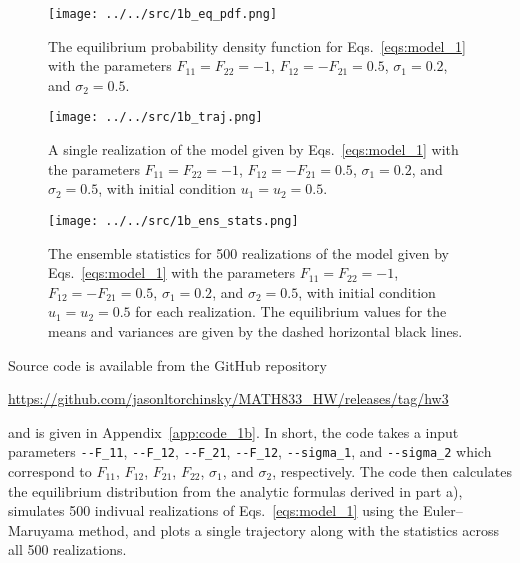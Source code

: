 \begin{enumerate}[a)]
	\begin{figure}[H]
		\centering
		\texttt{[image: ../../src/1b\_eq\_pdf.png]}
		\caption{The equilibrium probability density function for Eqs.~\ref{eqs:model_1} with the parameters $F_{11} = F_{22} = -1$, $F_{12} = -F_{21} = 0.5$, $\sigma_1 = 0.2$, and $\sigma_2 = 0.5$.}
		\label{fig:1b_eq_pdf}
	\end{figure}
	
	\begin{figure}[H]
		\centering
		\texttt{[image: ../../src/1b\_traj.png]}
		\caption{A single realization of the model given by Eqs.~\ref{eqs:model_1} with the parameters $F_{11} = F_{22} = -1$, $F_{12} = -F_{21} = 0.5$, $\sigma_1 = 0.2$, and $\sigma_2 = 0.5$, with initial condition $u_1 = u_2 = 0.5$.}
		\label{fig:1b_traj}
	\end{figure}
	
	\begin{figure}[H]
		\centering
		\texttt{[image: ../../src/1b\_ens\_stats.png]}
		\caption{The ensemble statistics for 500 realizations of the model given by Eqs.~\ref{eqs:model_1} with the parameters $F_{11} = F_{22} = -1$, $F_{12} = -F_{21} = 0.5$, $\sigma_1 = 0.2$, and $\sigma_2 = 0.5$, with initial condition $u_1 = u_2 = 0.5$ for each realization. The equilibrium values for the means and variances are given by the dashed horizontal black lines.}
		\label{fig:1b_ens_stats}
	\end{figure}
	
	Source code is available from the GitHub repository
	
	\begin{center}
		\url{https://github.com/jasonltorchinsky/MATH833_HW/releases/tag/hw3}
	\end{center}

	and is given in Appendix~\ref{app:code_1b}. In short, the code takes a input parameters \texttt{-{-}F\_11}, \texttt{-{-}F\_12}, \texttt{-{-}F\_21}, \texttt{-{-}F\_12}, \texttt{-{-}sigma\_1}, and \texttt{-{-}sigma\_2} which correspond to $F_{11}$, $F_{12}$, $F_{21}$, $F_{22}$, $\sigma_1$, and $\sigma_2$, respectively. The code then calculates the equilibrium distribution from the analytic formulas derived in part a), simulates 500 indivual realizations of Eqs.~\ref{eqs:model_1} using the Euler--Maruyama method, and plots a single trajectory along with the statistics across all 500 realizations.
	
\end{enumerate}
